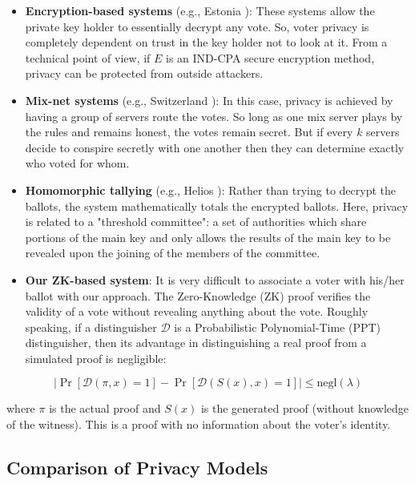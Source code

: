 \documentclass[12pt, a4paper]{report}
\begin{document}
\begin{itemize}
	\item \textbf{Encryption-based systems} (e.g., Estonia \cite{madise2005evoting}): These systems allow the private key holder to essentially decrypt any vote. So, voter privacy is completely dependent on trust in the key holder not to look at it. From a technical point of view, if $E$ is an IND-CPA secure encryption method, privacy can be protected from outside attackers.
	
	\item \textbf{Mix-net systems} (e.g., Switzerland \cite{federalchancellery_evoting}): In this case, privacy is achieved by having a group of servers route the votes. So long as one mix server plays by the rules and remains honest, the votes remain secret. But if every $k$ servers decide to conspire secretly with one another then they can determine exactly who voted for whom.
	
	\item \textbf{Homomorphic tallying} (e.g., Helios \cite{adida2008helios}): Rather than trying to decrypt the ballots, the system mathematically totals the encrypted ballots. Here, privacy is related to a "threshold committee": a set of authorities which share portions of the main key and only allows the results of the main key to be revealed upon the joining of the members of the committee.
	
	\item \textbf{Our ZK-based system}:  It is very difficult to associate a voter with his/her ballot with our approach. The Zero-Knowledge (ZK) proof verifies the validity of a vote without revealing anything about the vote. Roughly speaking, if a distinguisher $\mathcal{D}$ is a Probabilistic Polynomial-Time (PPT) distinguisher, then its advantage in distinguishing a real proof from a simulated proof is negligible:
\end{itemize}

\begin{equation}
|\Pr[\mathcal{D}(\pi, x) = 1] - \Pr[\mathcal{D}(S(x), x) = 1]| \leq \text{negl}(\lambda)
\end{equation}

where $\pi$ is the actual proof and $S(x)$ is the generated proof (without knowledge of the witness). This is a proof with no information about the voter's identity.

\subsection{Comparison of Privacy Models}
\end{document}
